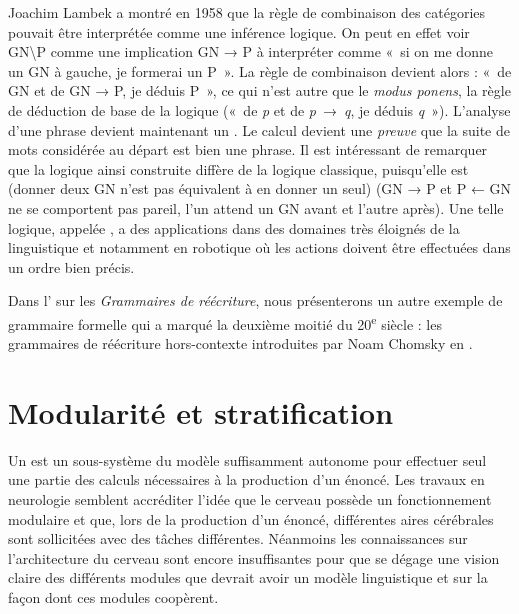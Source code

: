 {    Joachim Lambek a montré en 1958 que la règle de combinaison des catégories pouvait être interprétée comme une inférence logique. On peut en effet voir GN{\textbackslash}P comme une implication GN → P à interpréter comme «~si on me donne un GN à gauche, je formerai un P~». La règle de combinaison devient alors : «~de GN et de GN → P, je déduis P~», ce qui n’est autre que le \textit{modus ponens}, la règle de déduction de base de la logique («~de \textit{p} et de \textit{p}~→~\textit{q}, je déduis \textit{q}~»). L’analyse d’une phrase devient maintenant un . Le calcul devient une \textit{preuve} que la suite de mots considérée au départ est bien une phrase. Il est intéressant de remarquer que la logique ainsi construite diffère de la logique classique, puisqu’elle est  (donner deux GN n’est pas équivalent à en donner un seul)  (GN → P et P ← GN ne se comportent pas pareil, l’un attend un GN avant et l’autre après). Une telle logique, appelée , a des applications dans des domaines très éloignés de la linguistique et notamment en robotique où les actions doivent être effectuées dans un ordre bien précis.

    Dans l’ sur les \textit{Grammaires de réécriture}, nous présenterons un autre exemple de grammaire formelle qui a marqué la deuxième moitié du 20\textsuperscript{e} siècle : les grammaires de réécriture hors-contexte introduites par Noam Chomsky en \citeyear{chomsky1957syntactic}.
}
\section{Modularité et stratification}\label{sec:1.3.8}

Un  est un sous-système du modèle suffisamment autonome pour effectuer seul une partie des calculs nécessaires à la production d’un énoncé. Les travaux en neurologie semblent accréditer l’idée que le cerveau possède un fonctionnement modulaire et que, lors de la production d’un énoncé, différentes aires cérébrales sont sollicitées avec des tâches différentes. Néanmoins les connaissances sur l’architecture du cerveau sont encore insuffisantes pour que se dégage une vision claire des différents modules que devrait avoir un modèle linguistique et sur la façon dont ces modules coopèrent.

